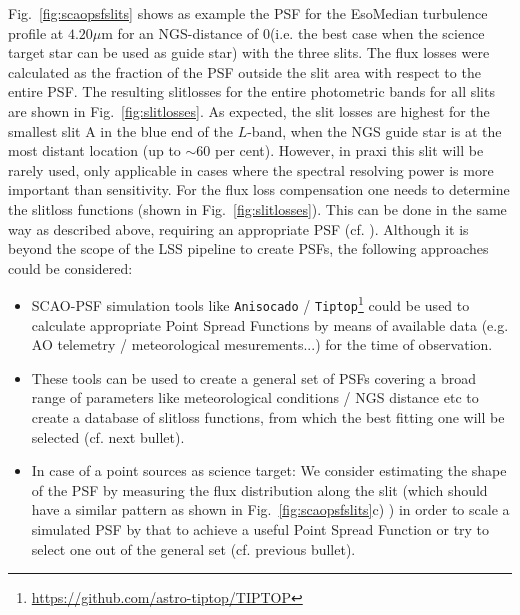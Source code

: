Fig.~\ref{fig:scaopsfslits} shows as example the \ac{PSF} for the EsoMedian turbulence profile at $4.20\mu$m for an \ac{NGS}-distance of 0\arcsec  (i.e. the best case when the science target star can be used as guide star) with the three slits. The flux losses were calculated as the fraction of the \ac{PSF} outside the slit area with respect to the entire \ac{PSF}. The resulting slitlosses for the entire photometric bands for all slits are shown in Fig.~\ref{fig:slitlosses}. As expected, the slit losses are highest for the smallest slit A in the blue end of the $L$-band, when the \ac{NGS} guide star is at the most distant location (up to $\sim60$ per cent). However, in praxi this slit will be rarely used, only applicable in cases where the spectral resolving power is more important than sensitivity. %
For the flux loss compensation one needs to determine the slitloss functions (shown in Fig.~\ref{fig:slitlosses}). This can be done in the same way as described above, requiring an appropriate \ac{PSF} (cf. ). Although it is beyond the scope of the \ac{LSS} pipeline to create \ac{PSF}s, the following approaches could be considered:
\begin{itemize}
    \item \ac{SCAO}-\ac{PSF} simulation tools like \texttt{Anisocado} / \texttt{Tiptop}\footnote{\url{https://github.com/astro-tiptop/TIPTOP}} could be used to calculate appropriate Point Spread Functions by means of available data (e.g. \ac{AO} telemetry / meteorological mesurements...) for the time of observation.
    \item These tools can be used to create a general set of \ac{PSF}s covering a broad range of parameters like meteorological conditions / \ac{NGS} distance etc to create a database of slitloss functions, from which the best fitting one will be selected (cf. next bullet).
    \item In case of a point sources as science target: We consider estimating the shape of the \ac{PSF} by measuring the flux distribution along the slit (which should have a similar pattern as shown in Fig.~\ref{fig:scaopsfslits}c) ) in order to scale a simulated \ac{PSF} by that to achieve a useful Point Spread Function or try to select one out of the general set (cf. previous bullet).
\end{itemize}
